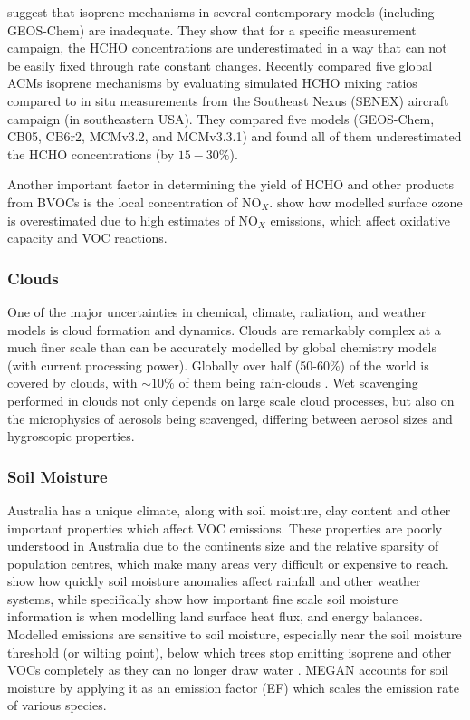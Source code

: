       \cite{Marvin2017} suggest that isoprene mechanisms in several contemporary models (including GEOS-Chem) are inadequate. 
      They show that for a specific measurement campaign, the HCHO concentrations are underestimated in a way that can not be easily fixed through rate constant changes.
      Recently \cite{Marvin2017} compared five global ACMs isoprene mechanisms by evaluating simulated HCHO mixing ratios compared to in situ measurements from the Southeast Nexus (SENEX) aircraft campaign (in southeastern USA).
      They compared five models (GEOS-Chem, CB05, CB6r2, MCMv3.2, and MCMv3.3.1) and found all of them underestimated the HCHO concentrations (by $15 - 30\%$).
      
      Another important factor in determining the yield of HCHO and other products from BVOCs is the local concentration of NO$_X$.
      \cite{Travis2016} show how modelled surface ozone is overestimated due to high estimates of  NO$_X$ emissions, which affect oxidative capacity and VOC reactions.
      
    
    \subsubsection{Clouds}
      \label{LR:Models:Uncert:Clouds}
      One of the major uncertainties in chemical, climate, radiation, and weather models is cloud formation and dynamics.
      Clouds are remarkably complex at a much finer scale than can be accurately modelled by global chemistry models (with current processing power).
      Globally over half (50-60\%) of the world is covered by clouds, with $\sim10\%$ of them being rain-clouds \citep{Kanakidou2005}.
      Wet scavenging performed in clouds not only depends on large scale cloud processes, but also on the microphysics of aerosols being scavenged, differing between aerosol sizes and hygroscopic properties.
      
    
    \subsubsection{Soil Moisture}
      \label{LR:Models:Uncert:SoilMoisture}
      Australia has a unique climate, along with soil moisture, clay content and other important properties which affect VOC emissions.
      These properties are poorly understood in Australia due to the continents size and the relative sparsity of population centres, which make many areas very difficult or expensive to reach.
      \cite{Rowntree1983} show how quickly soil moisture anomalies affect rainfall and other weather systems, while \cite{Chen2001} specifically show how important fine scale soil moisture information is when modelling land surface heat flux, and energy balances.
      Modelled emissions are sensitive to soil moisture, especially near the soil moisture threshold (or wilting point), below which trees stop emitting isoprene and other VOCs completely as they can no longer draw water \citep{Bauwens2016}.
      MEGAN accounts for soil moisture by applying it as an emission factor (EF) which scales the emission rate of various species.
      
